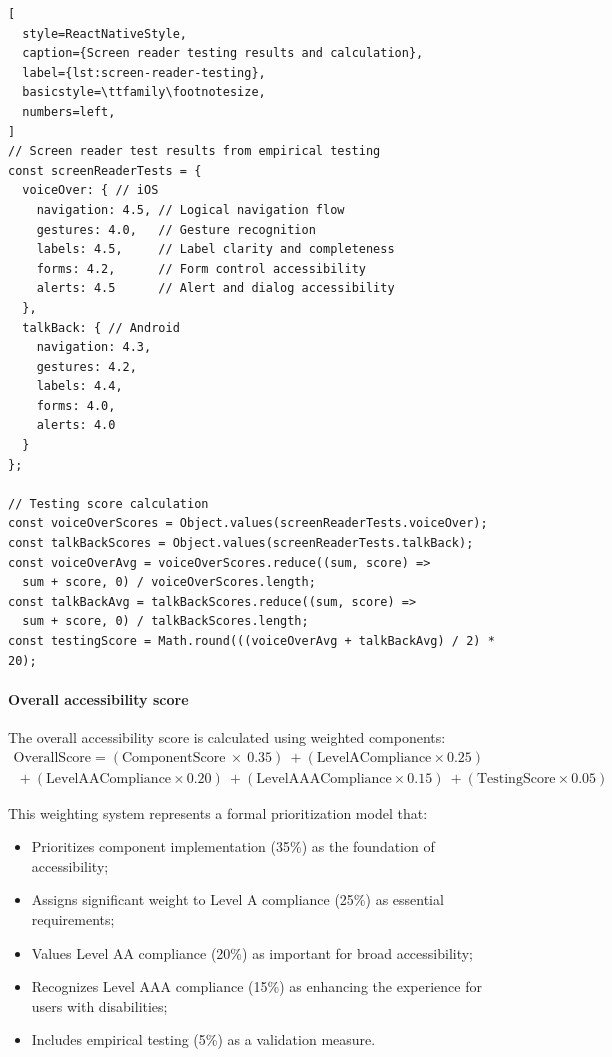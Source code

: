 \begin{lstlisting}[
  style=ReactNativeStyle,
  caption={Screen reader testing results and calculation},
  label={lst:screen-reader-testing},
  basicstyle=\ttfamily\footnotesize,
  numbers=left,
]
// Screen reader test results from empirical testing
const screenReaderTests = {
  voiceOver: { // iOS
    navigation: 4.5, // Logical navigation flow
    gestures: 4.0,   // Gesture recognition
    labels: 4.5,     // Label clarity and completeness
    forms: 4.2,      // Form control accessibility
    alerts: 4.5      // Alert and dialog accessibility
  },
  talkBack: { // Android
    navigation: 4.3,
    gestures: 4.2,
    labels: 4.4,
    forms: 4.0,
    alerts: 4.0
  }
};

// Testing score calculation
const voiceOverScores = Object.values(screenReaderTests.voiceOver);
const talkBackScores = Object.values(screenReaderTests.talkBack);
const voiceOverAvg = voiceOverScores.reduce((sum, score) => 
  sum + score, 0) / voiceOverScores.length;
const talkBackAvg = talkBackScores.reduce((sum, score) => 
  sum + score, 0) / talkBackScores.length;
const testingScore = Math.round(((voiceOverAvg + talkBackAvg) / 2) * 20);
\end{lstlisting}

\FloatBarrier

\paragraph{Overall accessibility score}

The overall accessibility score is calculated using weighted components:
\begin{equation}
\begin{split}
\text{OverallScore}
= (\text{ComponentScore} \ \times \ 0.35)  
\ + (\text{LevelACompliance} \times 0.25) \\
\ + (\text{LevelAACompliance} \times 0.20)
\ + (\text{LevelAAACompliance} \times 0.15)
\ + (\text{TestingScore} \times 0.05)
\end{split}
\end{equation}

This weighting system represents a formal prioritization model that:
\begin{itemize}
\item Prioritizes component implementation (35\%) as the foundation of accessibility;
\item Assigns significant weight to Level A compliance (25\%) as essential requirements;
\item Values Level AA compliance (20\%) as important for broad accessibility;
\item Recognizes Level AAA compliance (15\%) as enhancing the experience for users with disabilities;
\item Includes empirical testing (5\%) as a validation measure.
\end{itemize}

